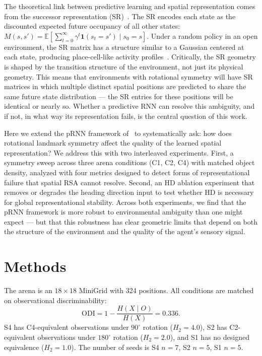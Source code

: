 \documentclass[11pt, a4paper]{article}
\begin{document}
The theoretical link between predictive learning and spatial representation
comes from the successor representation (SR)~\citep{stachenfeld2017}. The
SR encodes each state as the discounted expected future occupancy of all
other states: $M(s,s') = \mathbb{E}\left[\sum_{t=0}^{\infty} \gamma^t
\mathbf{1}(s_t = s') \mid s_0 = s\right]$. Under a random policy in an
open environment, the SR matrix has a structure similar to a Gaussian
centered at each state, producing place-cell-like activity
profiles~\citep{stachenfeld2017}. Critically, the SR geometry is shaped
by the transition structure of the environment, not just its physical
geometry. This means that environments with rotational symmetry will have
SR matrices in which multiple distinct spatial positions are predicted to
share the same future state distribution --- the SR entries for these
positions will be identical or nearly so. Whether a predictive RNN can
resolve this ambiguity, and if not, in what way its representation fails,
is the central question of this work.

Here we extend the pRNN framework of~\citet{levenstein2024} to
systematically ask: how does rotational landmark symmetry affect the
quality of the learned spatial representation? We address
this with two interleaved experiments. First, a symmetry sweep across
three arena conditions (C1, C2, C4) with matched object density, analyzed
with four metrics designed to detect forms of representational failure that
spatial RSA cannot resolve. Second, an HD ablation experiment that removes
or degrades the heading direction input to test whether HD is necessary for
global representational stability. Across both experiments, we find that the pRNN framework is more robust to
environmental ambiguity than one might expect --- but that this robustness
has clear geometric limits that depend on both the structure of the
environment and the quality of the agent's sensory signal.



\section*{Methods}

The arena is an $18 \times 18$ MiniGrid with 324 positions. All conditions are matched on observational discriminability:
\[
\mathrm{ODI}=1-\frac{H(X\mid O)}{H(X)}=0.336.
\]
S4 has C4-equivalent observations under $90^{\circ}$ rotation ($H_2=4.0$), S2 has C2-equivalent observations under $180^{\circ}$ rotation ($H_2=2.0$), and S1 has no designed equivalence ($H_2=1.0$). The number of seeds is S4 $n=7$, S2 $n=5$, S1 $n=5$.
\end{document}
